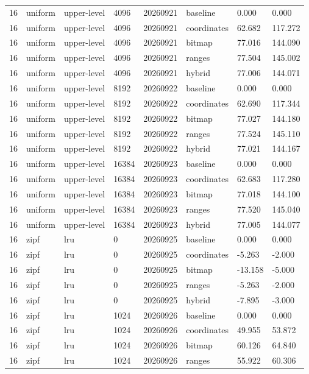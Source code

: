 \begin{tabular}{llllllll}
16 & uniform & upper-level & 4096 & 20260921 & baseline & 0.000 & 0.000 \\
16 & uniform & upper-level & 4096 & 20260921 & coordinates & 62.682 & 117.272 \\
16 & uniform & upper-level & 4096 & 20260921 & bitmap & 77.016 & 144.090 \\
16 & uniform & upper-level & 4096 & 20260921 & ranges & 77.504 & 145.002 \\
16 & uniform & upper-level & 4096 & 20260921 & hybrid & 77.006 & 144.071 \\
16 & uniform & upper-level & 8192 & 20260922 & baseline & 0.000 & 0.000 \\
16 & uniform & upper-level & 8192 & 20260922 & coordinates & 62.690 & 117.344 \\
16 & uniform & upper-level & 8192 & 20260922 & bitmap & 77.027 & 144.180 \\
16 & uniform & upper-level & 8192 & 20260922 & ranges & 77.524 & 145.110 \\
16 & uniform & upper-level & 8192 & 20260922 & hybrid & 77.021 & 144.167 \\
16 & uniform & upper-level & 16384 & 20260923 & baseline & 0.000 & 0.000 \\
16 & uniform & upper-level & 16384 & 20260923 & coordinates & 62.683 & 117.280 \\
16 & uniform & upper-level & 16384 & 20260923 & bitmap & 77.018 & 144.100 \\
16 & uniform & upper-level & 16384 & 20260923 & ranges & 77.520 & 145.040 \\
16 & uniform & upper-level & 16384 & 20260923 & hybrid & 77.005 & 144.077 \\
16 & zipf & lru & 0 & 20260925 & baseline & 0.000 & 0.000 \\
16 & zipf & lru & 0 & 20260925 & coordinates & -5.263 & -2.000 \\
16 & zipf & lru & 0 & 20260925 & bitmap & -13.158 & -5.000 \\
16 & zipf & lru & 0 & 20260925 & ranges & -5.263 & -2.000 \\
16 & zipf & lru & 0 & 20260925 & hybrid & -7.895 & -3.000 \\
16 & zipf & lru & 1024 & 20260926 & baseline & 0.000 & 0.000 \\
16 & zipf & lru & 1024 & 20260926 & coordinates & 49.955 & 53.872 \\
16 & zipf & lru & 1024 & 20260926 & bitmap & 60.126 & 64.840 \\
16 & zipf & lru & 1024 & 20260926 & ranges & 55.922 & 60.306 \\

\end{tabular}
